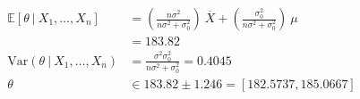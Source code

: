 \begin{enumerate}
		\begin{align}
			\mathbb{E}[\theta\ |\ X_1, \dots, X_n] &= \left(\frac{n\sigma^2}{n\sigma^2 + \sigma_0^2}\right)\ \overline{X} + \left(\frac{\sigma_0^2}{n\sigma^2 + \sigma_0^2}\right)\ \mu \nonumber \\
			&= 183.82 \nonumber \\
			\mathrm{Var}(\theta\ |\ X_1, \dots, X_n) &= \frac{\sigma^2 \sigma_0^2}{n\sigma^2 + \sigma_0^2} = 0.4045 \nonumber \\
			\theta &\in 183.82 \pm 1.246 = [182.5737, 185.0667]
		\end{align}
	
	
	
	
\end{enumerate}